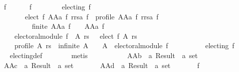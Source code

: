 \begin{isabellebody}
\ \ \ \ \ \ f{}{\isacharcolon}{\kern0pt}\isanewline
\ \ \ \ \ \ {\isachardoublequoteopen}{\isasymforall}f{\isachardot}{\kern0pt}\isanewline
\ \ \ \ \ \ \ \ {\isacharparenleft}{\kern0pt}electing\ f\ {\isasymor}\isanewline
\ \ \ \ \ \ \ \ \ \ {\isacharbraceleft}{\kern0pt}{\isacharbraceright}{\kern0pt}\ {\isacharequal}{\kern0pt}\ elect\ f\ {\isacharparenleft}{\kern0pt}AAa\ f{\isacharparenright}{\kern0pt}\ {\isacharparenleft}{\kern0pt}rrsa\ f{\isacharparenright}{\kern0pt}\ {\isasymand}\ profile\ {\isacharparenleft}{\kern0pt}AAa\ f{\isacharparenright}{\kern0pt}\ {\isacharparenleft}{\kern0pt}rrsa\ f{\isacharparenright}{\kern0pt}\ {\isasymand}\isanewline
\ \ \ \ \ \ \ \ \ \ \ \ \ \ finite\ {\isacharparenleft}{\kern0pt}AAa\ f{\isacharparenright}{\kern0pt}\ {\isasymand}\ {\isacharbraceleft}{\kern0pt}{\isacharbraceright}{\kern0pt}\ {\isasymnoteq}\ AAa\ f\ {\isasymor}\isanewline
\ \ \ \ \ \ \ \ {\isasymnot}\ electoral{\isacharunderscore}{\kern0pt}module\ f{\isacharparenright}{\kern0pt}\ {\isasymand}\ {\isacharparenleft}{\kern0pt}{\isacharparenleft}{\kern0pt}{\isasymforall}A\ rs{\isachardot}{\kern0pt}\ {\isacharbraceleft}{\kern0pt}{\isacharbraceright}{\kern0pt}\ {\isasymnoteq}\ elect\ f\ A\ rs\ {\isasymor}\isanewline
\ \ \ \ \ \ \ \ {\isasymnot}\ profile\ A\ rs\ {\isasymor}\ infinite\ A\ {\isasymor}\ {\isacharbraceleft}{\kern0pt}{\isacharbraceright}{\kern0pt}\ {\isacharequal}{\kern0pt}\ A{\isacharparenright}{\kern0pt}\ {\isasymand}\ electoral{\isacharunderscore}{\kern0pt}module\ f\ {\isasymor}\isanewline
\ \ \ \ \ \ \ \ {\isasymnot}\ electing\ f{\isacharparenright}{\kern0pt}{\isachardoublequoteclose}\isanewline
\ \ \ \ \ \ \isamarkupfalse%
\ electing{\isacharunderscore}{\kern0pt}def\isanewline
\ \ \ \ \ \ \isamarkupfalse%
\ metis\isanewline
\ \ \ \ \isamarkupfalse%
\isanewline
\ \ \ \ \ \ AAb\ {\isacharcolon}{\kern0pt}{\isacharcolon}{\kern0pt}\ {\isachardoublequoteopen}{\isacharprime}{\kern0pt}a\ Result\ {\isasymRightarrow}\ {\isacharprime}{\kern0pt}a\ set{\isachardoublequoteclose}\ \isanewline
\ \ \ \ \ \ AAc\ {\isacharcolon}{\kern0pt}{\isacharcolon}{\kern0pt}\ {\isachardoublequoteopen}{\isacharprime}{\kern0pt}a\ Result\ {\isasymRightarrow}\ {\isacharprime}{\kern0pt}a\ set{\isachardoublequoteclose}\ \isanewline
\ \ \ \ \ \ AAd\ {\isacharcolon}{\kern0pt}{\isacharcolon}{\kern0pt}\ {\isachardoublequoteopen}{\isacharprime}{\kern0pt}a\ Result\ {\isasymRightarrow}\ {\isacharprime}{\kern0pt}a\ set{\isachardoublequoteclose}\ \isanewline
\ \ \ \ \ \ f{}{\isacharcolon}{\kern0pt}\isanewline

\end{isabellebody}
